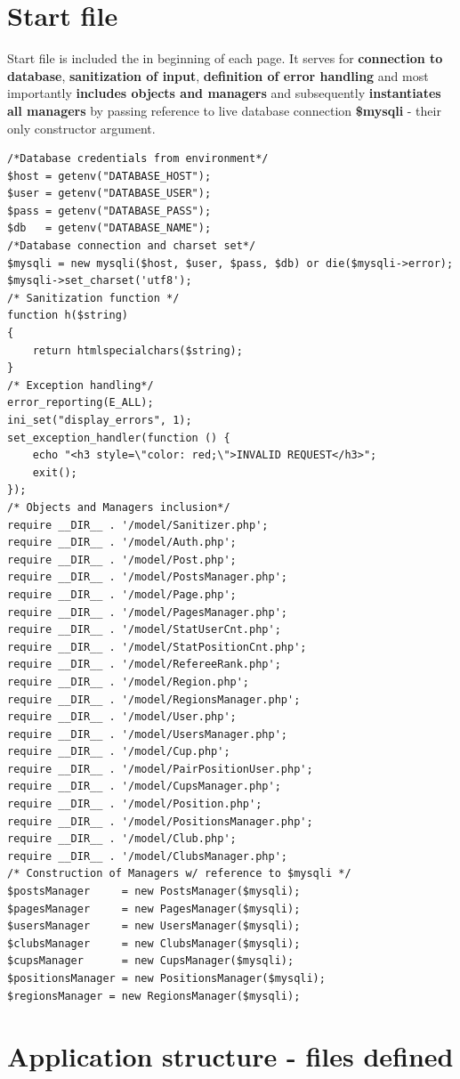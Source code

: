 \section{Start file}
Start file is included the in beginning of each page. It serves for \textbf{connection to database},  \textbf{sanitization of input}, \textbf{definition of error handling} and most importantly \textbf{includes objects and managers} and subsequently \textbf{instantiates all managers} by passing reference to live database connection \textbf{\$mysqli} - their only constructor argument.
\begin{lstlisting}
/*Database credentials from environment*/
$host = getenv("DATABASE_HOST");
$user = getenv("DATABASE_USER");
$pass = getenv("DATABASE_PASS");
$db   = getenv("DATABASE_NAME");
/*Database connection and charset set*/
$mysqli = new mysqli($host, $user, $pass, $db) or die($mysqli->error);
$mysqli->set_charset('utf8');
/* Sanitization function */
function h($string)
{
    return htmlspecialchars($string);
}
/* Exception handling*/
error_reporting(E_ALL);
ini_set("display_errors", 1);
set_exception_handler(function () {
    echo "<h3 style=\"color: red;\">INVALID REQUEST</h3>";
    exit();
});
/* Objects and Managers inclusion*/
require __DIR__ . '/model/Sanitizer.php';
require __DIR__ . '/model/Auth.php';
require __DIR__ . '/model/Post.php';
require __DIR__ . '/model/PostsManager.php';
require __DIR__ . '/model/Page.php';
require __DIR__ . '/model/PagesManager.php';
require __DIR__ . '/model/StatUserCnt.php';
require __DIR__ . '/model/StatPositionCnt.php';
require __DIR__ . '/model/RefereeRank.php';
require __DIR__ . '/model/Region.php';
require __DIR__ . '/model/RegionsManager.php';
require __DIR__ . '/model/User.php';
require __DIR__ . '/model/UsersManager.php';
require __DIR__ . '/model/Cup.php';
require __DIR__ . '/model/PairPositionUser.php';
require __DIR__ . '/model/CupsManager.php';
require __DIR__ . '/model/Position.php';
require __DIR__ . '/model/PositionsManager.php';
require __DIR__ . '/model/Club.php';
require __DIR__ . '/model/ClubsManager.php';
/* Construction of Managers w/ reference to $mysqli */
$postsManager     = new PostsManager($mysqli);
$pagesManager     = new PagesManager($mysqli);
$usersManager     = new UsersManager($mysqli);
$clubsManager     = new ClubsManager($mysqli);
$cupsManager      = new CupsManager($mysqli);
$positionsManager = new PositionsManager($mysqli);
$regionsManager = new RegionsManager($mysqli);
\end{lstlisting}
\newpage
\section{Application structure - files defined}
